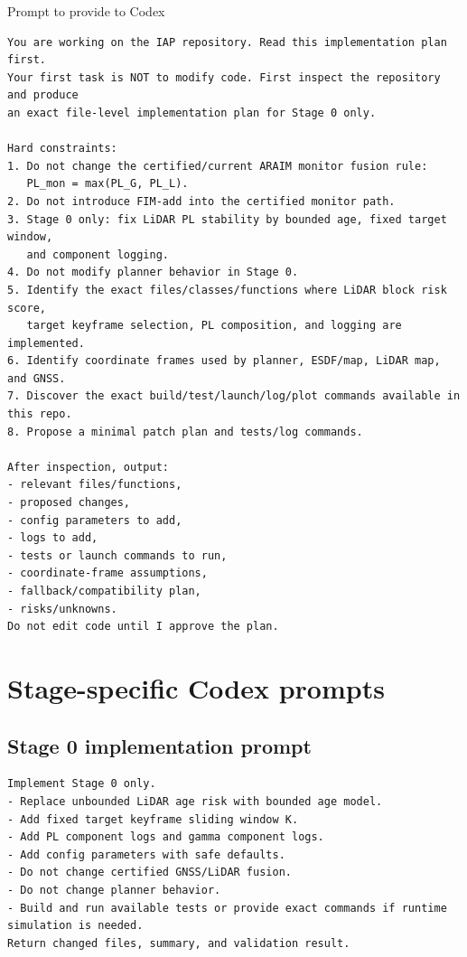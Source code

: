 \documentclass[11pt,a4paper]{article}
\begin{document}
\begin{codexbox}{Prompt to provide to Codex}
\begin{lstlisting}
You are working on the IAP repository. Read this implementation plan first.
Your first task is NOT to modify code. First inspect the repository and produce
an exact file-level implementation plan for Stage 0 only.

Hard constraints:
1. Do not change the certified/current ARAIM monitor fusion rule:
   PL_mon = max(PL_G, PL_L).
2. Do not introduce FIM-add into the certified monitor path.
3. Stage 0 only: fix LiDAR PL stability by bounded age, fixed target window,
   and component logging.
4. Do not modify planner behavior in Stage 0.
5. Identify the exact files/classes/functions where LiDAR block risk score,
   target keyframe selection, PL composition, and logging are implemented.
6. Identify coordinate frames used by planner, ESDF/map, LiDAR map, and GNSS.
7. Discover the exact build/test/launch/log/plot commands available in this repo.
8. Propose a minimal patch plan and tests/log commands.

After inspection, output:
- relevant files/functions,
- proposed changes,
- config parameters to add,
- logs to add,
- tests or launch commands to run,
- coordinate-frame assumptions,
- fallback/compatibility plan,
- risks/unknowns.
Do not edit code until I approve the plan.
\end{lstlisting}
\end{codexbox}

\section{Stage-specific Codex prompts}

\subsection{Stage 0 implementation prompt}
\begin{lstlisting}
Implement Stage 0 only.
- Replace unbounded LiDAR age risk with bounded age model.
- Add fixed target keyframe sliding window K.
- Add PL component logs and gamma component logs.
- Add config parameters with safe defaults.
- Do not change certified GNSS/LiDAR fusion.
- Do not change planner behavior.
- Build and run available tests or provide exact commands if runtime simulation is needed.
Return changed files, summary, and validation result.
\end{lstlisting}
\end{document}
